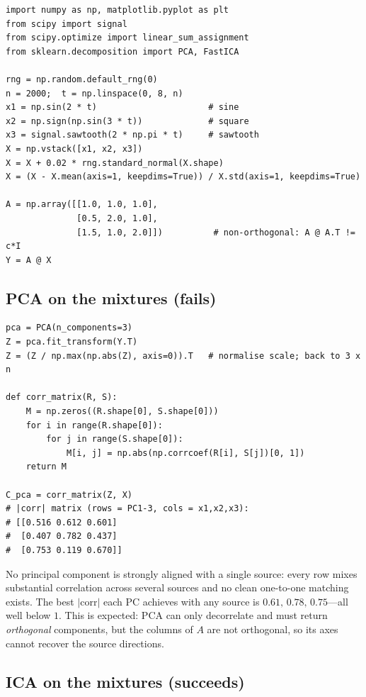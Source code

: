 \documentclass[10pt,a4paper]{article}
\begin{document}
\begin{lstlisting}
import numpy as np, matplotlib.pyplot as plt
from scipy import signal
from scipy.optimize import linear_sum_assignment
from sklearn.decomposition import PCA, FastICA

rng = np.random.default_rng(0)
n = 2000;  t = np.linspace(0, 8, n)
x1 = np.sin(2 * t)                      # sine
x2 = np.sign(np.sin(3 * t))             # square
x3 = signal.sawtooth(2 * np.pi * t)     # sawtooth
X = np.vstack([x1, x2, x3])
X = X + 0.02 * rng.standard_normal(X.shape)
X = (X - X.mean(axis=1, keepdims=True)) / X.std(axis=1, keepdims=True)

A = np.array([[1.0, 1.0, 1.0],
              [0.5, 2.0, 1.0],
              [1.5, 1.0, 2.0]])          # non-orthogonal: A @ A.T != c*I
Y = A @ X
\end{lstlisting}

\subsection{PCA on the mixtures (fails)}

\begin{lstlisting}
pca = PCA(n_components=3)
Z = pca.fit_transform(Y.T)
Z = (Z / np.max(np.abs(Z), axis=0)).T   # normalise scale; back to 3 x n

def corr_matrix(R, S):
    M = np.zeros((R.shape[0], S.shape[0]))
    for i in range(R.shape[0]):
        for j in range(S.shape[0]):
            M[i, j] = np.abs(np.corrcoef(R[i], S[j])[0, 1])
    return M

C_pca = corr_matrix(Z, X)
# |corr| matrix (rows = PC1-3, cols = x1,x2,x3):
# [[0.516 0.612 0.601]
#  [0.407 0.782 0.437]
#  [0.753 0.119 0.670]]
\end{lstlisting}

No principal component is strongly aligned with a single source: every row mixes substantial
correlation across several sources and no clean one-to-one matching exists. The best
$|\text{corr}|$ each PC achieves with any source is $0.61,\,0.78,\,0.75$---all well below $1$.
This is expected: PCA can only decorrelate and must return \emph{orthogonal} components, but
the columns of $A$ are not orthogonal, so its axes cannot recover the source directions.

\subsection{ICA on the mixtures (succeeds)}
\end{document}
